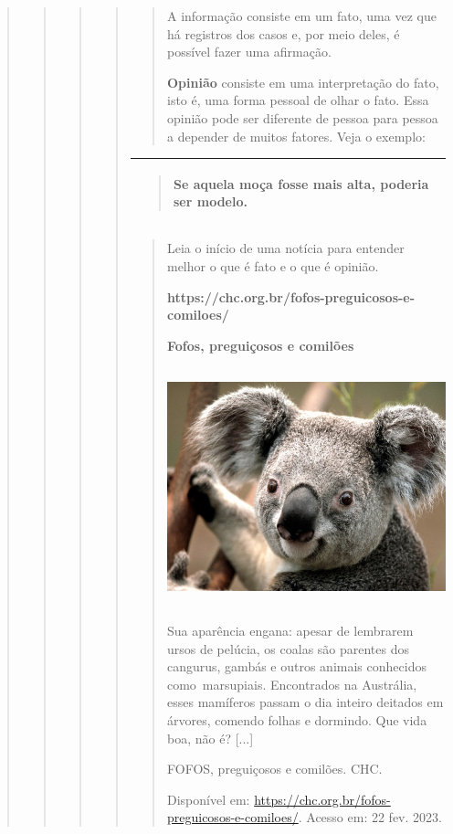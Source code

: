 \begin{quote}
\begin{quote}
\begin{quote}
\begin{quote}
\begin{quote}
A informação consiste em um fato, uma vez que há registros dos casos e,
por meio deles, é possível fazer uma afirmação.

\textbf{Opinião} consiste em uma interpretação do fato, isto é, uma
forma pessoal de olhar o fato. Essa opinião pode ser diferente de pessoa
para pessoa a depender de muitos fatores. Veja o exemplo:
\end{quote}

\begin{longtable}[]{@{}l@{}}
\toprule
\begin{minipage}[t]{0.97\columnwidth}\raggedright\strut
\begin{quote}
Se aquela moça fosse mais alta, poderia ser modelo.
\end{quote}\strut
\end{minipage}\tabularnewline
\bottomrule
\end{longtable}

\begin{quote}
Leia o início de uma notícia para entender melhor o que é fato e o que é
opinião.

\textbf{https://chc.org.br/fofos-preguicosos-e-comiloes/}

\textbf{Fofos, preguiçosos e comilões}

\includegraphics[width=3.61389in,height=2.71042in]{media/image25.jpeg}

Sua aparência engana: apesar de lembrarem ursos de pelúcia, os coalas
são parentes dos cangurus, gambás e outros animais conhecidos
como~marsupiais. Encontrados na Austrália, esses mamíferos passam o dia
inteiro deitados em árvores, comendo folhas e dormindo. Que vida boa,
não é? {[}...{]}

FOFOS, preguiçosos e comilões. CHC.

Disponível em: \url{https://chc.org.br/fofos-preguicosos-e-comiloes/}.
Acesso em: 22 fev. 2023.


\end{quote}
\end{quote}
\end{quote}
\end{quote}
\end{quote}
